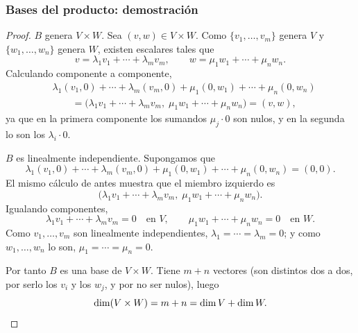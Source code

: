 \begin{frame}[allowframebreaks, t]
    \frametitle{Bases del producto: demostración}

    \begin{proof}
        \alert{$B$ genera $V\times W$.}
        Sea $(v,w)\in V\times W$. Como $\{v_1,\ldots,v_m\}$ genera $V$ y
        $\{w_1,\ldots,w_n\}$ genera $W$, existen escalares tales que
        \[
            v=\lambda_1v_1+\cdots+\lambda_mv_m,
            \qquad
            w=\mu_1w_1+\cdots+\mu_nw_n.
        \]
        Calculando componente a componente,
        \begin{align*}
            &\lambda_1(v_1,0)+\cdots+\lambda_m(v_m,0)
            +\mu_1(0,w_1)+\cdots+\mu_n(0,w_n)\\
            &\qquad=
            \bigl(\lambda_1v_1+\cdots+\lambda_mv_m,\;
                  \mu_1w_1+\cdots+\mu_nw_n\bigr)
            =(v,w),
        \end{align*}
        ya que en la primera componente los sumandos $\mu_j\cdot0$ son
        nulos, y en la segunda lo son los $\lambda_i\cdot0$.

        \framebreak

        \alert{$B$ es linealmente independiente.}
        Supongamos que
        \[
            \lambda_1(v_1,0)+\cdots+\lambda_m(v_m,0)
            +\mu_1(0,w_1)+\cdots+\mu_n(0,w_n)=(0,0).
        \]
        El mismo cálculo de antes muestra que el miembro izquierdo es
        \[
            \bigl(\lambda_1v_1+\cdots+\lambda_mv_m,\;
                  \mu_1w_1+\cdots+\mu_nw_n\bigr).
        \]
        Igualando componentes,
        \[
            \lambda_1v_1+\cdots+\lambda_mv_m=0
            \quad\text{en } V,
            \qquad
            \mu_1w_1+\cdots+\mu_nw_n=0
            \quad\text{en } W.
        \]
        Como $v_1,\ldots,v_m$ son linealmente independientes,
        $\lambda_1=\cdots=\lambda_m=0$; y como $w_1,\ldots,w_n$ lo son,
        $\mu_1=\cdots=\mu_n=0$.

        Por tanto $B$ es una base de $V\times W$. Tiene $m+n$ vectores
        (son distintos dos a dos, por serlo los $v_i$ y los $w_j$, y por
        no ser nulos), luego
        \[
            \dim(V\times W)=m+n=\dim V+\dim W.\qedhere
        \]
    \end{proof}
\end{frame}


